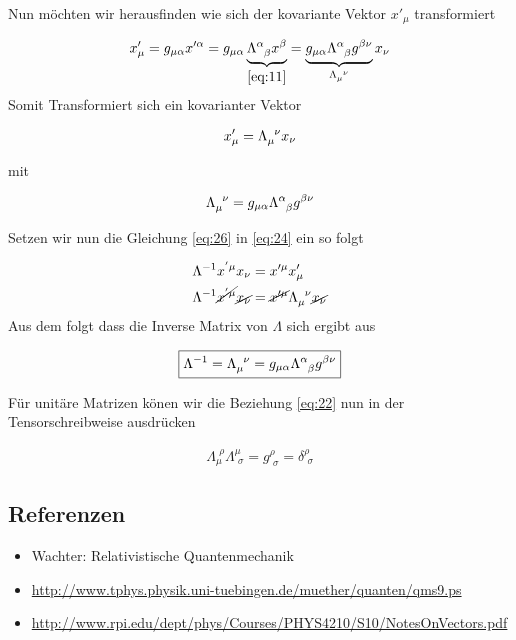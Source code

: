 Nun möchten wir herausfinden wie sich der kovariante Vektor \(x'_{\mu}\) transformiert

\begin{align}
  \label{eq:25}
  x'_{\mu} = g_{\mu\alpha} x'^\alpha =  g_{\mu\alpha}\underbrace{ \Lambda^{\alpha}_{\hphantom\alpha \beta}x^\beta}_{\eqref{eq:11}} =\underbrace{ g_{\mu\alpha}\Lambda^{\alpha}_{\hphantom\alpha \beta}g^{\beta\nu}}_{\Lambda^{\hphantom \mu \nu}_{\mu}}x_{\nu}
\end{align}
Somit Transformiert sich ein kovarianter Vektor

\begin{align}
  \label{eq:26}
   x'_{\mu} = \Lambda^{\hphantom \mu \nu}_{\mu}x_{\nu}
\end{align}

mit 

\begin{align}
  \label{eq:27}
  \Lambda^{\hphantom \mu \nu}_{\mu} = g_{\mu\alpha}\Lambda^{\alpha}_{\hphantom\alpha \beta}g^{\beta\nu}
\end{align}

Setzen wir nun die Gleichung \eqref{eq:26} in \eqref{eq:24} ein so folgt

\begin{align}
  \label{eq:28}
  \Lambda^{-1}x^{'\mu} x_\nu &= x'^{\mu}x'_{\mu} \notag \\
 \Lambda^{-1}\cancel{x^{'\mu}}\cancel{ x_\nu} &= \cancel{x'^{\mu}}\Lambda^{\hphantom \mu \nu}_{\mu}\cancel{x_{\nu}} \notag \\
\end{align}
Aus dem folgt dass die Inverse Matrix von \(\Lambda\) sich ergibt aus

\begin{align}
  \label{eq:29}
   \boxed{ \Lambda^{-1} = \Lambda^{\hphantom \mu \nu}_{\mu} = g_{\mu\alpha}\Lambda^{\alpha}_{\hphantom\alpha \beta}g^{\beta\nu} }
\end{align}


Für unitäre Matrizen könen wir die Beziehung  \eqref{eq:22} nun in der Tensorschreibweise ausdrücken

\begin{align}
  \label{eq:17}
 \boxed{ \Lambda_\mu^{\,\, \rho}\Lambda^\mu_{\,\,\sigma} = g^\rho_{\,\,\sigma} = \delta^\rho_{\,\, \sigma} }
\end{align}







\subsection*{Referenzen}
\begin{itemize}
\item Wachter: Relativistische Quantenmechanik
\item \url{http://www.tphys.physik.uni-tuebingen.de/muether/quanten/qms9.ps}
\item \url{http://www.rpi.edu/dept/phys/Courses/PHYS4210/S10/NotesOnVectors.pdf}
\end{itemize}


